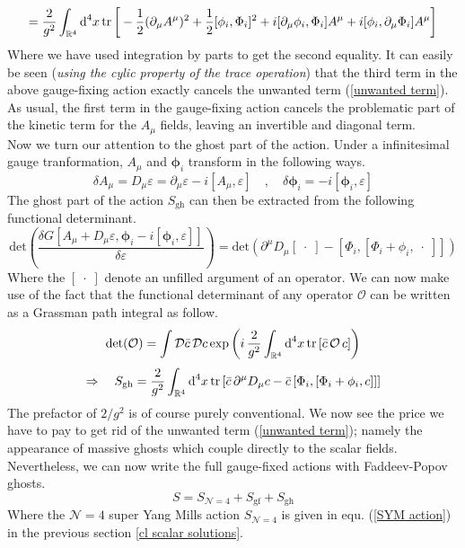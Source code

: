 %
%
\begin{equation}
=
%
\frac{2}{g^2} \int_{\mathbb{R}^4} \text{d}^4 x
\tr \bigg[
-\frac{1}{2} (\partial_\mu A^\mu)^2
+ \frac{1}{2} [\phi_i, \Phi_i]^2
+ i [\partial_\mu \phi_i, \Phi_i] A^\mu
+ i [\phi_i, \partial_\mu \Phi_i] A^\mu
\bigg]
\end{equation}
%
%
Where we have used integration by parts to get the second equality. It can easily be seen (\textit{using the cylic property of the trace operation}) that the third term in the above gauge-fixing action exactly cancels the unwanted term (\ref{unwanted term}). As usual, the first term in the gauge-fixing action cancels the problematic part of the kinetic term for the $A_\mu$ fields, leaving an invertible and diagonal term.\\
Now we turn our attention to the ghost part of the action. Under a infinitesimal gauge tranformation, $A_\mu$ and $\boldsymbol{\phi}_i$ transform in the following ways.
%
%
\begin{equation}
\delta A_\mu = D_\mu \varepsilon = \partial_\mu \varepsilon - i [A_\mu, \varepsilon]
%
\quad , \quad
%
\delta \boldsymbol{\phi}_i = -i [\boldsymbol{\phi}_i, \varepsilon]
\end{equation}
%
%
The ghost part of the action $S_{\text{gh}}$ can then be extracted from the following functional determinant.
%
%
\begin{equation}
\text{det} \left(
\frac{\delta G[A_\mu + D_\mu \varepsilon, \boldsymbol{\phi}_i - i[\boldsymbol{\phi}_i, \varepsilon]]}{\delta \varepsilon}
\right)
=
\text{det} \left(
\partial^\mu D_\mu [\; \cdot \; ]
- [\Phi_i, [\Phi_i + \phi_i, \; \cdot \; ]]
\right)
\end{equation}
%
%
Where the $[ \; \cdot \;]$ denote an unfilled argument of an operator. We can now make use of the fact that the functional determinant of any operator $\mathcal{O}$ can be written as a Grassman path integral as follow.
%
%
\begin{equation}
\text{det} ( \mathcal{O} )
%
=
%
\int \mathcal{D} \bar{c} \, \mathcal{D}c \exp
\left(
i \, \frac{2}{g^2} \int_{\mathbb{R}^4} \text{d}^4 x
\trace \left[ \bar{c} \, \mathcal{O} \, c \right]
\right)
\end{equation}
%
%
\begin{equation}
\Rightarrow \quad
%
S_{\text{gh}} = \frac{2}{g^2} \int_{\mathbb{R}^4} \text{d}^4 x
\tr \left[
\bar{c} \, \partial^\mu D_\mu c
- \bar{c} \, [\Phi_i, [\Phi_i + \phi_i, c]]
\right]
\end{equation}
%
%
The prefactor of $2 / g^2$ is of course purely conventional. We now see the price we have to pay to get rid of the unwanted term (\ref{unwanted term}); namely the appearance of massive ghosts which couple directly to the scalar fields. Nevertheless, we can now write the full gauge-fixed actions with Faddeev-Popov ghosts.
%
%
\begin{equation}
S = S_{\mathcal{N} = 4} + S_{\text{gf}} + S_{\text{gh}}
\end{equation}
%
%
Where the $\mathcal{N}=4$ super Yang Mills action $S_{\mathcal{N} = 4}$ is given in equ. (\ref{SYM action}) in the previous section \ref{cl scalar solutions}.

